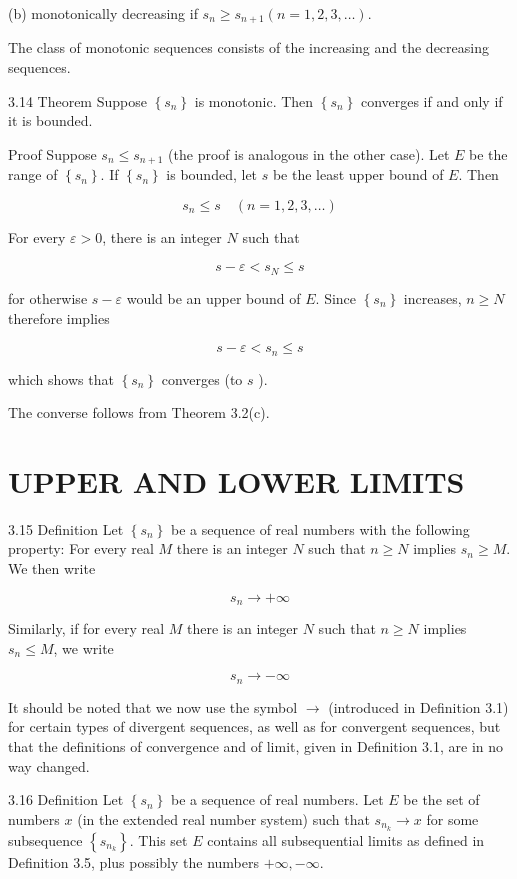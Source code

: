\documentclass[10pt]{article}
\begin{document}
(b) monotonically decreasing if $s_{n} \geq s_{n+1}(n=1,2,3, \ldots)$.

The class of monotonic sequences consists of the increasing and the decreasing sequences.

3.14 Theorem Suppose $\left\{s_{n}\right\}$ is monotonic. Then $\left\{s_{n}\right\}$ converges if and only if it is bounded.

Proof Suppose $s_{n} \leq s_{n+1}$ (the proof is analogous in the other case). Let $E$ be the range of $\left\{s_{n}\right\}$. If $\left\{s_{n}\right\}$ is bounded, let $s$ be the least upper bound of $E$. Then

$$
s_{n} \leq s \quad(n=1,2,3, \ldots)
$$

For every $\varepsilon>0$, there is an integer $N$ such that

$$
s-\varepsilon<s_{N} \leq s
$$

for otherwise $s-\varepsilon$ would be an upper bound of $E$. Since $\left\{s_{n}\right\}$ increases, $n \geq N$ therefore implies

$$
s-\varepsilon<s_{n} \leq s
$$

which shows that $\left\{s_{n}\right\}$ converges (to $s$ ).

The converse follows from Theorem 3.2(c).

\section{UPPER AND LOWER LIMITS}
3.15 Definition Let $\left\{s_{n}\right\}$ be a sequence of real numbers with the following property: For every real $M$ there is an integer $N$ such that $n \geq N$ implies $s_{n} \geq M$. We then write

$$
s_{n} \rightarrow+\infty
$$

Similarly, if for every real $M$ there is an integer $N$ such that $n \geq N$ implies $s_{n} \leq M$, we write

$$
s_{n} \rightarrow-\infty
$$

It should be noted that we now use the symbol $\rightarrow$ (introduced in Definition 3.1) for certain types of divergent sequences, as well as for convergent sequences, but that the definitions of convergence and of limit, given in Definition 3.1, are in no way changed.

3.16 Definition Let $\left\{s_{n}\right\}$ be a sequence of real numbers. Let $E$ be the set of numbers $x$ (in the extended real number system) such that $s_{n_{k}} \rightarrow x$ for some subsequence $\left\{s_{n_{k}}\right\}$. This set $E$ contains all subsequential limits as defined in Definition 3.5, plus possibly the numbers $+\infty,-\infty$.
\end{document}
